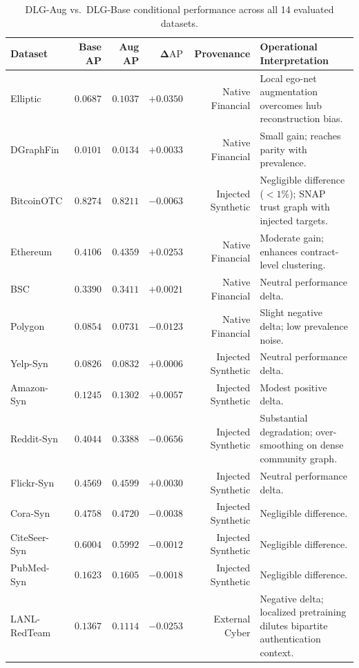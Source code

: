\documentclass[applsci,article,submit,moreauthors,pdftex]{Definitions/mdpi}
\begin{document}
\begin{table}[htbp]
\centering\small
\caption{DLG-Aug vs.\ DLG-Base conditional performance across all 14 evaluated datasets.}
\label{tab:conditional_delta}
\begin{tabularx}{\textwidth}{lrrrrX}\toprule
\textbf{Dataset} & \textbf{Base AP} & \textbf{Aug AP} & $\mathbf{\Delta\mathrm{AP}}$ & \textbf{Provenance} & \textbf{Operational Interpretation} \\\midrule
Elliptic & $0.0687$ & $0.1037$ & $\mathbf{+0.0350}$ & Native Financial & Local ego-net augmentation overcomes hub reconstruction bias. \\
DGraphFin & $0.0101$ & $0.0134$ & $+0.0033$ & Native Financial & Small gain; reaches parity with prevalence. \\
BitcoinOTC & $0.8274$ & $0.8211$ & $-0.0063$ & Injected Synthetic & Negligible difference ($<1\%$); SNAP trust graph with injected targets. \\
Ethereum & $0.4106$ & $0.4359$ & $\mathbf{+0.0253}$ & Native Financial & Moderate gain; enhances contract-level clustering. \\
BSC & $0.3390$ & $0.3411$ & $+0.0021$ & Native Financial & Neutral performance delta. \\
Polygon & $0.0854$ & $0.0731$ & $-0.0123$ & Native Financial & Slight negative delta; low prevalence noise. \\
Yelp-Syn & $0.0826$ & $0.0832$ & $+0.0006$ & Injected Synthetic & Neutral performance delta. \\
Amazon-Syn & $0.1245$ & $0.1302$ & $+0.0057$ & Injected Synthetic & Modest positive delta. \\
Reddit-Syn & $0.4044$ & $0.3388$ & $\mathbf{-0.0656}$ & Injected Synthetic & Substantial degradation; over-smoothing on dense community graph. \\
Flickr-Syn & $0.4569$ & $0.4599$ & $+0.0030$ & Injected Synthetic & Neutral performance delta. \\
Cora-Syn & $0.4758$ & $0.4720$ & $-0.0038$ & Injected Synthetic & Negligible difference. \\
CiteSeer-Syn & $0.6004$ & $0.5992$ & $-0.0012$ & Injected Synthetic & Negligible difference. \\
PubMed-Syn & $0.1623$ & $0.1605$ & $-0.0018$ & Injected Synthetic & Negligible difference. \\\midrule
LANL-RedTeam & $0.1367$ & $0.1114$ & $\mathbf{-0.0253}$ & External Cyber & Negative delta; localized pretraining dilutes bipartite authentication context. \\\bottomrule
\end{tabularx}
\end{table}
\end{document}
